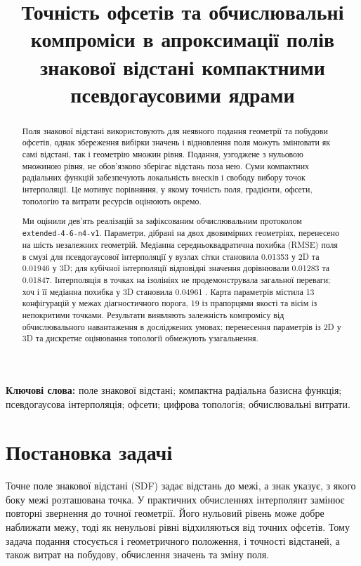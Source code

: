 \documentclass[12pt]{article}
\title{Точність офсетів та обчислювальні компроміси в апроксимації полів знакової відстані компактними псевдогаусовими ядрами}
\begin{document}
\maketitle
\begin{abstract}
    Поля знакової відстані використовують для неявного подання геометрії та побудови офсетів, однак збереження вибірки значень і відновлення поля можуть змінювати як самі відстані, так і геометрію множин рівня. Подання, узгоджене з нульовою множиною рівня, не обов'язково зберігає відстань поза нею. Суми компактних радіальних функцій забезпечують локальність внесків і свободу вибору точок інтерполяції. Це мотивує порівняння, у якому точність поля, градієнти, офсети, топологію та витрати ресурсів оцінюють окремо.

    Ми оцінили дев'ять реалізацій за зафіксованим обчислювальним протоколом \texttt{extended-4-6-n4-v1}. Параметри, дібрані на двох двовимірних геометріях, перенесено на шість незалежних геометрій. Медіанна середньоквадратична похибка (RMSE) поля в смузі для псевдогаусової інтерполяції у вузлах сітки становила 0.01353 у 2D та 0.01946 у 3D; для кубічної інтерполяції відповідні значення дорівнювали 0.01283 та 0.01847. Інтерполяція в точках на ізолініях не продемонструвала загальної переваги; хоч і її медіанна похибка у 3D становила 0.04961 . Карта параметрів містила 13 конфігурацій у межах діагностичного порога, 19 із прапорцями якості та вісім із непокритими точками. Результати виявляють залежність компромісу від обчислювального навантаження в досліджених умовах; перенесення параметрів із 2D у 3D та дискретне оцінювання топології обмежують узагальнення.
\end{abstract}
\noindent\textbf{Ключові слова:} поле знакової відстані; компактна радіальна базисна функція; псевдогаусова інтерполяція; офсети; цифрова топологія; обчислювальні витрати.

\section{Постановка задачі}
Точне поле знакової відстані (SDF) задає відстань до межі, а знак указує, з якого боку межі розташована точка. У практичних обчисленнях інтерполянт замінює повторні звернення до точної геометрії. Його нульовий рівень може добре наближати межу, тоді як ненульові рівні відхиляються від точних офсетів. Тому задача подання стосується і геометричного положення, і точності відстаней, а також витрат на побудову, обчислення значень та зміну поля.
\end{document}
